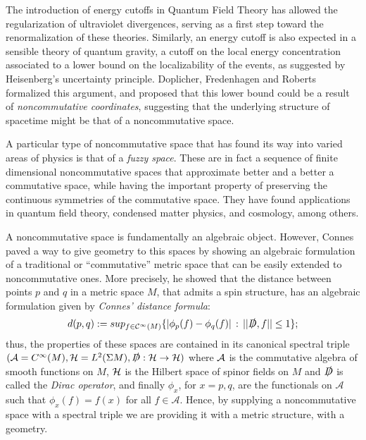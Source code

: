 The introduction of energy cutoffs in Quantum Field Theory has allowed the regularization of ultraviolet divergences, serving as a first step toward the renormalization of these theories. Similarly, an energy cutoff is also expected in a sensible theory of quantum gravity, a cutoff on the local energy concentration associated to a lower bound on the localizability of the events, as suggested by Heisenberg's uncertainty principle. Doplicher, Fredenhagen and Roberts \cite{DFR} formalized this argument, and proposed that this lower bound could be a result of \textit{noncommutative coordinates}, suggesting that the underlying structure of spacetime might be that of a noncommutative space.

A particular type of noncommutative space that has found its way into varied areas of physics is that of a \emph{fuzzy space}. These are in fact a sequence of finite dimensional noncommutative spaces that approximate better and a better a commutative space, while having the important property of preserving the continuous symmetries of the commutative space. They have found applications in quantum field theory, condensed matter physics, and  cosmology, among others.

A noncommutative space is fundamentally an algebraic object. However, Connes \cite{Connes1994} paved a way to give geometry to this spaces by showing an algebraic formulation of a traditional or ``commutative'' metric space that can be easily extended to noncommutative ones. More precisely, he showed that the distance between points $p$ and $q$ in a metric space $M$, that admits a spin structure, has an algebraic formulation given by \textit{Connes' distance formula}: 
\begin{equation}
    d(p, q) := sup_{f \in \mathcal C^\infty(M)}\{ |\phi_p(f) - \phi_q(f)| \,:\,  ||\slashed D, f|| \leq 1 \};
\end{equation}
thus, the properties of these spaces are contained in its canonical spectral triple $(\mathcal A = C^\infty(M), \mathcal H = L^2(\Sigma M), \slashed D: \mathcal H \to \mathcal H)$ where $\mathcal A$ is the commutative algebra of smooth functions on $M$, $\mathcal H$ is the Hilbert space of spinor fields on $M$ and $\slashed D$ is called the \emph{Dirac operator}, and finally $\phi_x$, for $x = p, q$, are the functionals on $\mathcal A$ such that $\phi_x(f) = f(x)$ for all $f \in \mathcal A$. Hence, by supplying a noncommutative space with a spectral triple we are providing it with a metric structure, with a geometry.

